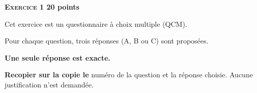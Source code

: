 \documentclass[11pt]{article}
\begin{document}
\vspace{0.5cm}

\textbf{{\large \textsc{Exercice 1}} \hfill 20 points}

\medskip

Cet exercice est un questionnaire à choix multiple (QCM).

Pour chaque question, trois réponses (A, B ou C) sont proposées.

\textbf{Une seule réponse est exacte.}

\textbf{Recopier sur la copie le} numéro de la question et la réponse choisie. Aucune justification n’est demandée.
\end{document}
